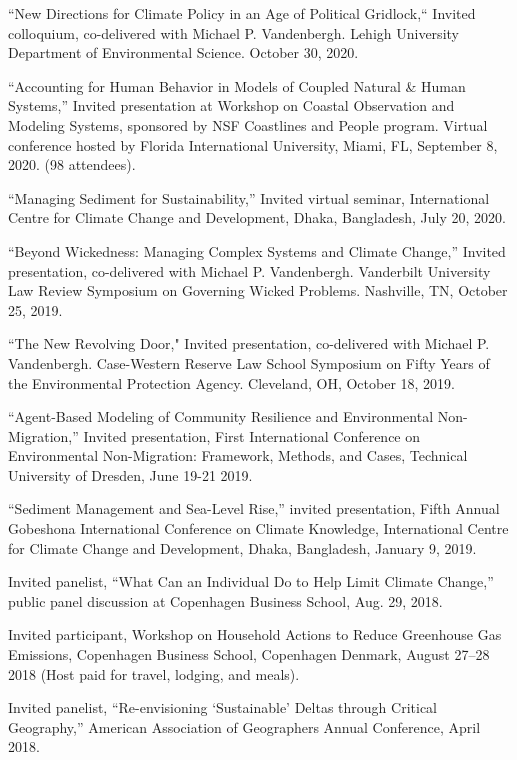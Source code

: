 %
%
\item ``New Directions for Climate Policy in an Age of Political Gridlock,`` Invited colloquium, co-delivered with Michael P. Vandenbergh. Lehigh University Department of Environmental Science. October 30, 2020.
\item ``Accounting for Human Behavior in Models of Coupled Natural \& Human Systems,'' Invited presentation at Workshop on Coastal Observation and Modeling Systems, sponsored by NSF Coastlines and People program. Virtual conference hosted by Florida International University, Miami, FL, September 8, 2020. (98 attendees).
\item ``Managing Sediment for Sustainability,'' Invited virtual seminar, International Centre for Climate Change and Development, Dhaka, Bangladesh, July 20, 2020.
\item ``Beyond Wickedness: Managing Complex Systems and Climate Change,'' Invited presentation, co-delivered with Michael P. Vandenbergh. Vanderbilt University Law Review Symposium on Governing Wicked Problems. Nashville, TN, October 25, 2019.
\item ``The New Revolving Door," Invited presentation, co-delivered with Michael P. Vandenbergh. Case-Western Reserve Law School Symposium on Fifty Years of the Environmental Protection Agency. Cleveland, OH, October 18, 2019.
\item ``Agent-Based Modeling of Community Resilience and Environmental Non-Migration,'' Invited presentation, First International Conference on Environmental Non-Migration: Framework, Methods, and Cases, Technical University of Dresden, June 19-21 2019.
\item ``Sediment Management and Sea-Level Rise,'' invited presentation, Fifth Annual Gobeshona International Conference on Climate Knowledge, International Centre for Climate Change and Development, Dhaka, Bangladesh, January 9, 2019.
\item Invited panelist, ``What Can an Individual Do to Help Limit Climate Change,'' public panel discussion at Copenhagen Business School, Aug. 29, 2018.
\item Invited participant, Workshop on Household Actions to Reduce Greenhouse Gas Emissions, Copenhagen Business School, Copenhagen Denmark, August 27--28 2018 (Host paid for travel, lodging, and meals).
\item Invited panelist, ``Re-envisioning `Sustainable' Deltas through Critical Geography,'' American Association of Geographers Annual Conference, April 2018.
